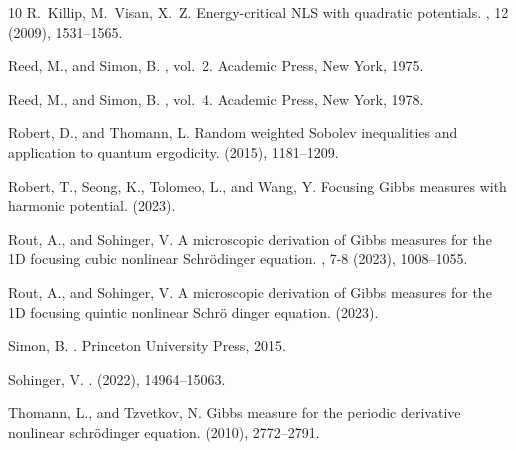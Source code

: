\documentclass[%
11pt,  reqno]{amsart}
\theoremstyle{remarkstyle}
\newcommand{\1}{\hspace{0.2mm}\text{I}\hspace{0.2mm}}
\numberwithin{equation}{section}
\numberwithin{theorem}{section}
\begin{document}
\begin{thebibliography}{10}
		{\sc R.~Killip, M.~Visan, X.~Z.}
		\newblock Energy-critical {NLS} with quadratic potentials.
		, 12 (2009),
		1531--1565.
		
		{\sc Reed, M., and Simon, B.}
		, vol.~2.
		\newblock Academic Press, New York, 1975.
		
		{\sc Reed, M., and Simon, B.}
		, vol.~4.
		\newblock Academic Press, New York, 1978.
		
		{\sc Robert, D., and Thomann, L.}
		\newblock Random weighted {S}obolev inequalities and application to quantum
		ergodicity.
		 (2015),
		1181--1209.
		
		{\sc Robert, T., Seong, K., Tolomeo, L., and Wang, Y.}
		\newblock Focusing {G}ibbs measures with harmonic potential.
		 (2023).
		
		{\sc Rout, A., and Sohinger, V.}
		\newblock A microscopic derivation of {G}ibbs measures for the {1D} focusing
		cubic nonlinear {S}chr\"odinger equation.
		, 7-8
		(2023), 1008--1055.
		
		{\sc Rout, A., and Sohinger, V.}
		\newblock A microscopic derivation of {G}ibbs measures for the {1D} focusing
		quintic nonlinear {S}chr\"{o} dinger equation.
		 (2023).
		
		{\sc Simon, B.}
		.
		\newblock Princeton University Press, 2015.
		
		{\sc Sohinger, V.}
		.
		 (2022),
		14964--15063.
		
		{\sc Thomann, L., and Tzvetkov, N.}
		\newblock Gibbs measure for the periodic derivative nonlinear schr\"odinger
		equation.
		 (2010), 2772--2791.
		

\end{thebibliography}
\end{document}
